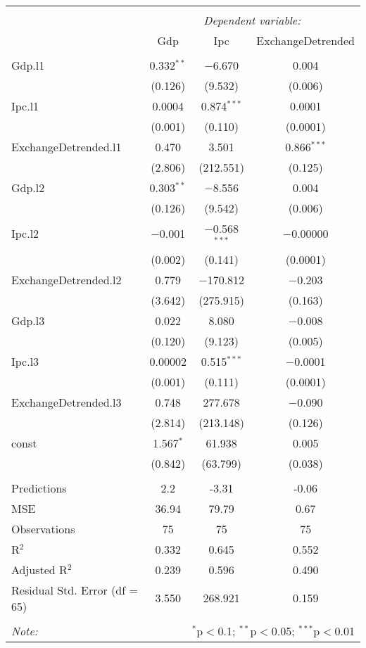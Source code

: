 
\begin{table}[H] \centering 
  \caption{} 
  \label{tb:var_3} 
\begin{tabular}{@{\extracolsep{5pt}}lccc} 
\\[-1.8ex]\hline 
\hline \\[-1.8ex] 
 & \multicolumn{3}{c}{\textit{Dependent variable:}} \\ 
\cline{2-4} 
 & Gdp & Ipc & ExchangeDetrended \\ 
\hline \\[-1.8ex] 
 Gdp.l1 & 0.332$^{**}$ & $-$6.670 & 0.004 \\ 
  & (0.126) & (9.532) & (0.006) \\ 
  Ipc.l1 & 0.0004 & 0.874$^{***}$ & 0.0001 \\ 
  & (0.001) & (0.110) & (0.0001) \\ 
  ExchangeDetrended.l1 & 0.470 & 3.501 & 0.866$^{***}$ \\ 
  & (2.806) & (212.551) & (0.125) \\ 
  Gdp.l2 & 0.303$^{**}$ & $-$8.556 & 0.004 \\ 
  & (0.126) & (9.542) & (0.006) \\ 
  Ipc.l2 & $-$0.001 & $-$0.568$^{***}$ & $-$0.00000 \\ 
  & (0.002) & (0.141) & (0.0001) \\ 
  ExchangeDetrended.l2 & 0.779 & $-$170.812 & $-$0.203 \\ 
  & (3.642) & (275.915) & (0.163) \\ 
  Gdp.l3 & 0.022 & 8.080 & $-$0.008 \\ 
  & (0.120) & (9.123) & (0.005) \\ 
  Ipc.l3 & 0.00002 & 0.515$^{***}$ & $-$0.0001 \\ 
  & (0.001) & (0.111) & (0.0001) \\ 
  ExchangeDetrended.l3 & 0.748 & 277.678 & $-$0.090 \\ 
  & (2.814) & (213.148) & (0.126) \\ 
  const & 1.567$^{*}$ & 61.938 & 0.005 \\ 
  & (0.842) & (63.799) & (0.038) \\ 
 \hline \\[-1.8ex] 
Predictions & 2.2 & -3.31 & -0.06 \\ 
MSE & 36.94 & 79.79 & 0.67 \\ 
Observations & 75 & 75 & 75 \\ 
R$^{2}$ & 0.332 & 0.645 & 0.552 \\ 
Adjusted R$^{2}$ & 0.239 & 0.596 & 0.490 \\ 
Residual Std. Error (df = 65) & 3.550 & 268.921 & 0.159 \\ 
\hline 
\hline \\[-1.8ex] 
\textit{Note:}  & \multicolumn{3}{r}{$^{*}$p$<$0.1; $^{**}$p$<$0.05; $^{***}$p$<$0.01} \\ 
\end{tabular} 
\end{table} 
